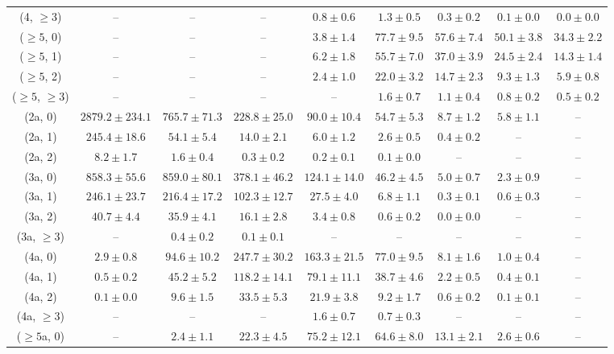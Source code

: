 \begin{table}[h!]
{\begin{tabular}{ccccccccc}
	(4, $\ge3$) & -- & -- & -- & $0.8\pm 0.6$ & $1.3\pm 0.5$ & $0.3\pm 0.2$ & $0.1\pm 0.0$ & $0.0\pm 0.0$ \\[0.5ex] 
	($\ge5$, 0) & -- & -- & -- & $3.8\pm 1.4$ & $77.7\pm 9.5$ & $57.6\pm 7.4$ & $50.1\pm 3.8$ & $34.3\pm 2.2$ \\[0.5ex] 
	($\ge5$, 1) & -- & -- & -- & $6.2\pm 1.8$ & $55.7\pm 7.0$ & $37.0\pm 3.9$ & $24.5\pm 2.4$ & $14.3\pm 1.4$ \\[0.5ex] 
	($\ge5$, 2) & -- & -- & -- & $2.4\pm 1.0$ & $22.0\pm 3.2$ & $14.7\pm 2.3$ & $9.3\pm 1.3$ & $5.9\pm 0.8$ \\[0.5ex] 
	($\ge5$, $\ge3$) & -- & -- & -- & -- & $1.6\pm 0.7$ & $1.1\pm 0.4$ & $0.8\pm 0.2$ & $0.5\pm 0.2$ \\[0.5ex] 
	(2a, 0) & $2879.2\pm 234.1$ & $765.7\pm 71.3$ & $228.8\pm 25.0$ & $90.0\pm 10.4$ & $54.7\pm 5.3$ & $8.7\pm 1.2$ & $5.8\pm 1.1$ & -- \\[0.5ex] 
	(2a, 1) & $245.4\pm 18.6$ & $54.1\pm 5.4$ & $14.0\pm 2.1$ & $6.0\pm 1.2$ & $2.6\pm 0.5$ & $0.4\pm 0.2$ & -- & -- \\[0.5ex] 
	(2a, 2) & $8.2\pm 1.7$ & $1.6\pm 0.4$ & $0.3\pm 0.2$ & $0.2\pm 0.1$ & $0.1\pm 0.0$ & -- & -- & -- \\[0.5ex] 
	(3a, 0) & $858.3\pm 55.6$ & $859.0\pm 80.1$ & $378.1\pm 46.2$ & $124.1\pm 14.0$ & $46.2\pm 4.5$ & $5.0\pm 0.7$ & $2.3\pm 0.9$ & -- \\[0.5ex] 
	(3a, 1) & $246.1\pm 23.7$ & $216.4\pm 17.2$ & $102.3\pm 12.7$ & $27.5\pm 4.0$ & $6.8\pm 1.1$ & $0.3\pm 0.1$ & $0.6\pm 0.3$ & -- \\[0.5ex] 
	(3a, 2) & $40.7\pm 4.4$ & $35.9\pm 4.1$ & $16.1\pm 2.8$ & $3.4\pm 0.8$ & $0.6\pm 0.2$ & $0.0\pm 0.0$ & -- & -- \\[0.5ex] 
	(3a, $\ge3$) & -- & $0.4\pm 0.2$ & $0.1\pm 0.1$ & -- & -- & -- & -- & -- \\[0.5ex] 
	(4a, 0) & $2.9\pm 0.8$ & $94.6\pm 10.2$ & $247.7\pm 30.2$ & $163.3\pm 21.5$ & $77.0\pm 9.5$ & $8.1\pm 1.6$ & $1.0\pm 0.4$ & -- \\[0.5ex] 
	(4a, 1) & $0.5\pm 0.2$ & $45.2\pm 5.2$ & $118.2\pm 14.1$ & $79.1\pm 11.1$ & $38.7\pm 4.6$ & $2.2\pm 0.5$ & $0.4\pm 0.1$ & -- \\[0.5ex] 
	(4a, 2) & $0.1\pm 0.0$ & $9.6\pm 1.5$ & $33.5\pm 5.3$ & $21.9\pm 3.8$ & $9.2\pm 1.7$ & $0.6\pm 0.2$ & $0.1\pm 0.1$ & -- \\[0.5ex] 
	(4a, $\ge3$) & -- & -- & -- & $1.6\pm 0.7$ & $0.7\pm 0.3$ & -- & -- & -- \\[0.5ex] 
	($\ge5$a, 0) & -- & $2.4\pm 1.1$ & $22.3\pm 4.5$ & $75.2\pm 12.1$ & $64.6\pm 8.0$ & $13.1\pm 2.1$ & $2.6\pm 0.6$ & -- \\[0.5ex] 

\end{tabular}}
\end{table}
